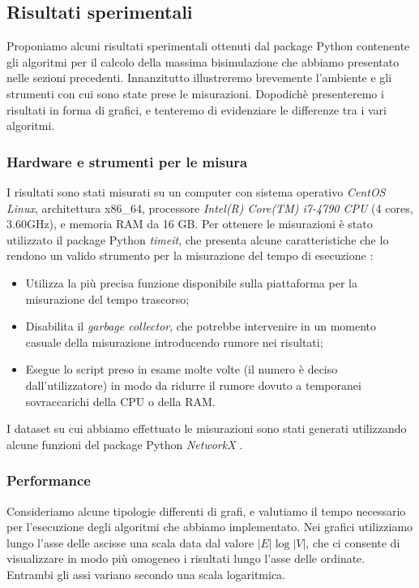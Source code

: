 \subsection{Risultati sperimentali}
Proponiamo alcuni risultati sperimentali ottenuti dal package Python contenente gli algoritmi per il calcolo della massima bisimulazione che abbiamo presentato nelle sezioni precedenti. Innanzitutto illustreremo brevemente l'ambiente e gli strumenti con cui sono state prese le misurazioni. Dopodichè presenteremo i risultati in forma di grafici, e tenteremo di evidenziare le differenze tra i vari algoritmi.

\subsubsection{Hardware e strumenti per le misura}
I risultati sono stati misurati su un computer con sistema operativo \emph{CentOS Linux}, architettura x86\_64, processore \emph{Intel(R) Core(TM) i7-4790 CPU} (4 cores, 3.60GHz), e memoria RAM da 16 GB. Per ottenere le misurazioni è stato utilizzato il package Python \emph{timeit}, che presenta alcune caratteristiche che lo rendono un valido strumento per la misurazione del tempo di esecuzione \cite{pythondocs}:
\begin{itemize}
    \item Utilizza la più precisa funzione disponibile sulla piattaforma per la misurazione del tempo trascorso;
    \item Disabilita il \emph{garbage collector}, che potrebbe intervenire in un momento casuale della misurazione introducendo rumore nei risultati;
    \item Esegue lo script preso in esame molte volte (il numero è deciso dall'utilizzatore) in modo da ridurre il rumore dovuto a temporanei sovraccarichi della CPU o della RAM.
\end{itemize}

I dataset su cui abbiamo effettuato le misurazioni sono stati generati utilizzando alcune funzioni del package Python \emph{NetworkX} \cite{networkx}.

\subsubsection{Performance}
Consideriamo alcune tipologie differenti di grafi, e valutiamo il tempo necessario per l'esecuzione degli algoritmi che abbiamo implementato. Nei grafici utilizziamo lungo l'asse delle ascisse una scala data dal valore $|E| \log |V|$, che ci consente di visualizzare in modo più omogeneo i risultati lungo l'asse delle ordinate. Entrambi gli assi variano secondo una scala logaritmica.

